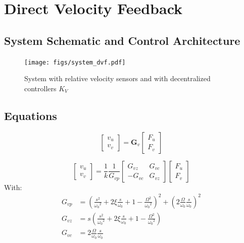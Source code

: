 \documentclass{ISMA_USD2020}
\begin{document}
\section{Direct Velocity Feedback}
\label{sec:org7628683}
\subsection{System Schematic and Control Architecture}
\label{sec:org6953bc7}
\begin{figure}[htbp]
\centering
\texttt{[image: figs/system\_dvf.pdf]}
\caption{\label{fig:system_dvf}System with relative velocity sensors and with decentralized controllers \(K_V\)}
\end{figure}

\subsection{Equations}
\label{sec:orgfab42cd}

\begin{equation}
\begin{bmatrix} v_u \\ v_v \end{bmatrix} =
\bm{G}_v
\begin{bmatrix} F_u \\ F_v \end{bmatrix}
\end{equation}

\begin{equation}
\begin{bmatrix} v_u \\ v_v \end{bmatrix} =
\frac{1}{k} \frac{1}{G_{vp}}
\begin{bmatrix}
   G_{vz} & G_{vc} \\
  -G_{vc} & G_{vz}
\end{bmatrix}
\begin{bmatrix} F_u \\ F_v \end{bmatrix}
\end{equation}
With:
\begin{subequations}
  \begin{align}
    G_{vp} &= \left( \frac{s^2}{{\omega_0}^2} + 2 \xi \frac{s}{\omega_0} + 1 - \frac{{\Omega}^2}{{\omega_0}^2} \right)^2 + \left( 2 \frac{\Omega}{\omega_0} \frac{s}{\omega_0} \right)^2 \\
    G_{vz} &= s \left( \frac{s^2}{{\omega_0}^2} + 2 \xi \frac{s}{\omega_0} + 1 - \frac{{\Omega}^2}{{\omega_0}^2} \right) \\
    G_{vc} &= 2 \frac{\Omega}{\omega_0} \frac{s}{\omega_0}
  \end{align}
\end{subequations}
\end{document}
